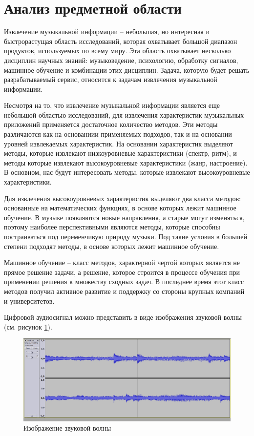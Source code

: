 \section{Анализ предметной области}
\label{sec:analysis}

Извлечение музыкальной информации -- небольшая, но интересная и быстрорастущая область исследований, которая охватывает большой диапазон продуктов, используемых по всему миру. Эта область охватывает \linebreak несколько дисциплин научных знаний: музыковедение, психологию, обработку сигналов, машинное обучение и комбинации этих дисциплин. Задача, которую будет решать разрабатываемый сервис, относится к задачам извлечения музыкальной информации.

Несмотря на то, что извлечение музыкальной информации является еще небольшой областью исследований, для извлечения характеристик музыкальных приложений применяется достаточное количество методов. Эти методы различаются как на основаниии применяемых подходов, так и на основании уровней извлекаемых характеристик. На основании характеристик выделяют методы, которые извлекают низкоуровневые характеристики (спектр, ритм), и методы которые извлекают высокоуровневые характеристики (жанр, настроение). В основном, нас будут интересовать методы, которые извлекают высокоуровневые характеристики.

Для извлечения высокоуровневых характеристик выделяют два класса методов: основанные на математических функциях, в основе которых лежит машинное обучение. В музыке появляются новые направления, а старые могут изменяться, поэтому наиболее перспективными являются методы, которые способны постраиваться под переменчивую природу музыки. Под такие условия в большей степени подходят методы, в основе которых лежит машинное обучение.

Машинное обучение -- класс методов, характерной чертой которых является не прямое решение задачи, а решение, которое строится в процессе обучения при применении решения к множеству сходных задач. В последнее время этот класс методов получил активное развитие и поддержку со стороны крупных компаний и университетов.

Цифровой аудиосигнал можно представить в виде изображения звуковой волны (см. рисунок \ref{sec:analysus:sound_wave}).

\begin{figure}[t]
\centering
	\includegraphics[scale=0.14]{attachments/sound_vawe.png}
	\caption{Изображение звуковой волны}
	\label{sec:analysus:sound_wave}
\end{figure}

